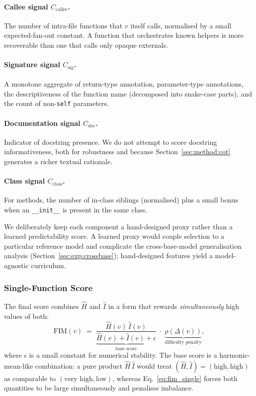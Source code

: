 \paragraph{Callee signal $C_{\mathrm{callee}}$.}
The number of intra-file functions that $v$ itself calls, normalised by a
small expected-fan-out constant. A function that orchestrates known
helpers is more recoverable than one that calls only opaque externals.

\paragraph{Signature signal $C_{\mathrm{sig}}$.}
A monotone aggregate of return-type annotation, parameter-type annotations,
the descriptiveness of the function name (decomposed into snake-case parts),
and the count of non-\texttt{self} parameters.

\paragraph{Documentation signal $C_{\mathrm{doc}}$.}
Indicator of docstring presence. We do not attempt to score docstring
informativeness, both for robustness and because Section~\ref{sec:method:cot}
generates a richer textual rationale.

\paragraph{Class signal $C_{\mathrm{class}}$.}
For methods, the number of in-class siblings (normalised) plus a small bonus
when an \texttt{\_\_init\_\_} is present in the same class.

We deliberately keep each component a hand-designed proxy rather than a
learned predictability score. A learned proxy would couple selection to a
particular reference model and complicate the cross-base-model
generalisation analysis (Section~\ref{sec:exp:crossbase}); hand-designed
features yield a model-agnostic curriculum.

\subsubsection{Single-Function Score}
\label{sec:method:single}

The final score combines $\hat{H}$ and $\hat{I}$ in a form that rewards
\emph{simultaneously} high values of both:
%
\begin{equation}
  \mathrm{FIM}(v) \;=\;
  \underbrace{\frac{\hat{H}(v)\,\hat{I}(v)}{\hat{H}(v) + \hat{I}(v) + \epsilon}}_{\text{base score}}
  \;\cdot\;
  \underbrace{\rho\!\left(\Delta(v)\right)}_{\text{difficulty penalty}},
  \label{eq:fim_single}
\end{equation}
%
where $\epsilon$ is a small constant for numerical stability. The base score
is a harmonic-mean-like combination: a pure product
$\hat{H}\,\hat{I}$ would treat $(\hat{H}, \hat{I}) = (\text{high},
\text{high})$ as comparable to $(\text{very high}, \text{low})$, whereas
Eq.~\eqref{eq:fim_single} forces both quantities to be large simultaneously
and penalises imbalance.

